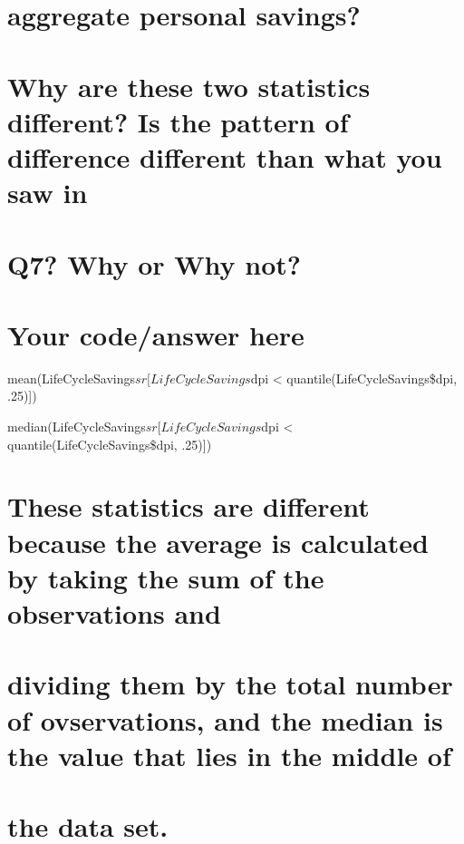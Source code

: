 \documentclass[]{article}
\begin{document}
\section{aggregate personal savings?}\label{aggregate-personal-savings}

\section{Why are these two statistics different? Is the pattern of
difference different than what you saw
in}\label{why-are-these-two-statistics-different-is-the-pattern-of-difference-different-than-what-you-saw-in}

\section{Q7? Why or Why not?}\label{q7-why-or-why-not}

\section{Your code/answer here}\label{your-codeanswer-here-7}

mean(LifeCycleSavings\(sr[LifeCycleSavings\)dpi \textless{}
quantile(LifeCycleSavings\$dpi, .25){]})

median(LifeCycleSavings\(sr[LifeCycleSavings\)dpi \textless{}
quantile(LifeCycleSavings\$dpi, .25){]})

\section{These statistics are different because the average is
calculated by taking the sum of the observations
and}\label{these-statistics-are-different-because-the-average-is-calculated-by-taking-the-sum-of-the-observations-and-1}

\section{dividing them by the total number of ovservations, and the
median is the value that lies in the middle
of}\label{dividing-them-by-the-total-number-of-ovservations-and-the-median-is-the-value-that-lies-in-the-middle-of-1}

\section{the data set.}\label{the-data-set.-1}
\end{document}
